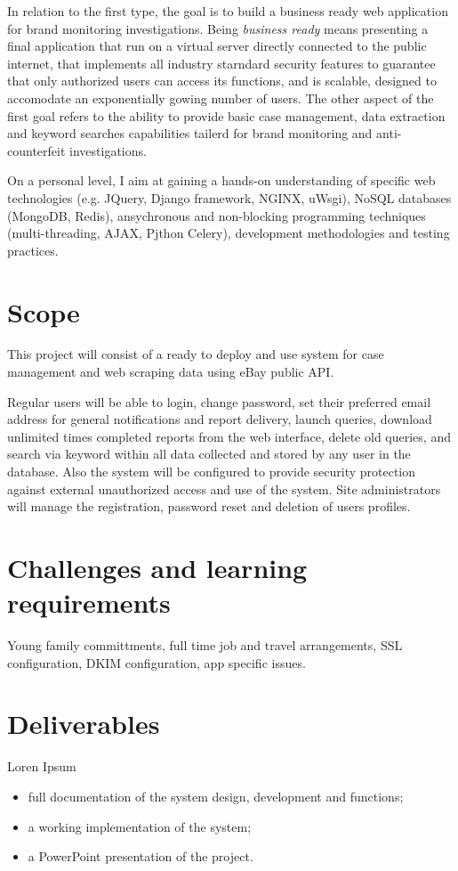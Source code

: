 In relation to the first type, the goal is to build a business ready web
application for brand monitoring investigations. Being \emph{business ready}
means presenting a final application that run on a virtual server directly
connected to the public internet, that implements all industry starndard
security features to guarantee that only authorized users can access its
functions, and is scalable, designed to accomodate an exponentially gowing
number of users. The other aspect of the first goal refers to the ability to
provide basic case management, data extraction and keyword searches capabilities
tailerd for brand monitoring and anti-counterfeit investigations.

On a personal level, I aim at gaining a hands-on understanding of specific web
technologies (e.g. JQuery, Django framework, NGINX, uWsgi), NoSQL databases
(MongoDB, Redis), ansychronous and non-blocking programming techniques
(multi-threading, AJAX, Pjthon Celery), development methodologies and testing
practices.


\section{Scope}
This project will consist of a ready to deploy and use system for case
management and web scraping data using eBay public API.

Regular users will be able to login, change password, set their preferred email
address for general notifications and report delivery, launch queries, download unlimited times
completed reports from the web interface, delete old queries, and search via
keyword within all data collected and stored by any user in the database. Also
the system will be configured to provide security protection against external
unauthorized access and use of the system. Site administrators will manage the
registration, password reset and deletion of users profiles.


\section{Challenges and learning requirements}
Young family committments, full time job and travel arrangements, SSL
configuration, DKIM configuration, app specific issues.


\section{Deliverables}
Loren Ipsum

\begin{itemize}
  \item full documentation of the system design, development and functions;
  \item a working implementation of the system;
  \item a PowerPoint presentation of the project.
\end{itemize}

